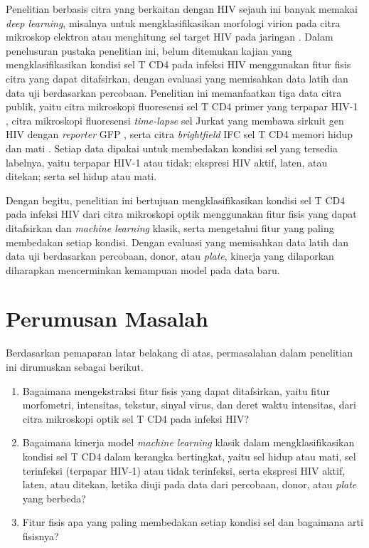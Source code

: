 Penelitian berbasis citra yang berkaitan dengan HIV sejauh ini banyak memakai \textit{deep learning}, misalnya untuk mengklasifikasikan morfologi virion pada citra mikroskop elektron \cite{rey2021temnet} atau menghitung sel target HIV pada jaringan \cite{shao2024hivtarget}. Dalam penelusuran pustaka penelitian ini, belum ditemukan kajian yang mengklasifikasikan kondisi sel T CD4 pada infeksi HIV menggunakan fitur fisis citra yang dapat ditafsirkan, dengan evaluasi yang memisahkan data latih dan data uji berdasarkan percobaan. Penelitian ini memanfaatkan tiga data citra publik, yaitu citra mikroskopi fluoresensi sel T CD4 primer yang terpapar HIV-1 \cite{ananth2024dataset}, citra mikroskopi fluoresensi \textit{time-lapse} sel Jurkat yang membawa sirkuit gen HIV dengan \textit{reporter} GFP \cite{lu2022dataset}, serta citra \textit{brightfield} IFC sel T CD4 memori hidup dan mati \cite{essig2022dataset}. Setiap data dipakai untuk membedakan kondisi sel yang tersedia labelnya, yaitu terpapar HIV-1 atau tidak; ekspresi HIV aktif, laten, atau ditekan; serta sel hidup atau mati.

Dengan begitu, penelitian ini bertujuan mengklasifikasikan kondisi sel T CD4 pada infeksi HIV dari citra mikroskopi optik menggunakan fitur fisis yang dapat ditafsirkan dan \textit{machine learning} klasik, serta mengetahui fitur yang paling membedakan setiap kondisi. Dengan evaluasi yang memisahkan data latih dan data uji berdasarkan percobaan, donor, atau \textit{plate}, kinerja yang dilaporkan diharapkan mencerminkan kemampuan model pada data baru.

\section{Perumusan Masalah}\label{perumusan-masalah}

Berdasarkan pemaparan latar belakang di atas, permasalahan dalam penelitian ini dirumuskan sebagai berikut.

\begin{enumerate}
  \item Bagaimana mengekstraksi fitur fisis yang dapat ditafsirkan, yaitu fitur morfometri, intensitas, tekstur, sinyal virus, dan deret waktu intensitas, dari citra mikroskopi optik sel T CD4 pada infeksi HIV?
  \item Bagaimana kinerja model \textit{machine learning} klasik dalam mengklasifikasikan kondisi sel T CD4 dalam kerangka bertingkat, yaitu sel hidup atau mati, sel terinfeksi (terpapar HIV-1) atau tidak terinfeksi, serta ekspresi HIV aktif, laten, atau ditekan, ketika diuji pada data dari percobaan, donor, atau \textit{plate} yang berbeda?
  \item Fitur fisis apa yang paling membedakan setiap kondisi sel dan bagaimana arti fisisnya?
\end{enumerate}

